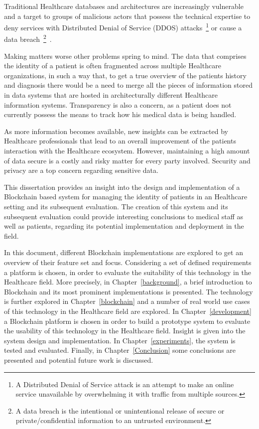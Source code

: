 Traditional Healthcare databases and architectures are increasingly vulnerable
and a target to groups of malicious actors that possess the technical expertise
to deny services with Distributed Denial of Service (DDOS) attacks~\footnote{A
Distributed Denial of Service attack is an attempt to make an online service
unavailable by overwhelming it with traffic from multiple sources.} or cause a
data breach~\footnote{A data breach is the intentional or unintentional release
of secure or private/confidential information to an untrusted
environment.}~\cite{mcCoy2018}. 

Making matters worse other problems spring to mind. The data that comprises the
identity of a patient is often fragmented across multiple Healthcare
organizations, in such a way that, to get a true overview of the patients
history and diagnosis there would be a need to merge all the pieces of
information stored in data systems that are hosted in architecturally different
Healthcare information systems. Transparency is also a concern, as a patient
does not currently possess the means to track how his medical data is being
handled.

As more information becomes available, new insights can be extracted by
Healthcare professionals that lead to an overall improvement of the patients
interaction with the Healthcare ecosystem. However, maintaining a high amount
of data secure is a costly and risky matter for every party involved. Security
and privacy are a top concern regarding sensitive data. 

This dissertation provides an insight into the design and implementation of a
Blockchain based system for managing the identity of patients in an Healthcare
setting and its subsequent evaluation. The creation of this system and its
subsequent evaluation could provide interesting conclusions to medical staff as
well as patients, regarding its potential implementation and deployment in the
field.

In this document, different Blockchain implementations are explored to get an
overview of their feature set and focus. Considering a set of defined
requirements a platform is chosen, in order to evaluate the suitability of this
technology in the Healthcare field. More precisely, in
Chapter~\ref{background}, a brief introduction to Blockchain and its most
prominent implementations is presented. The technology is further explored in
Chapter~\ref{blockchain} and a number of real world use cases of this
technology in the Healthcare field are explored.  In Chapter~\ref{development}
a Blockchain platform is chosen in order to build a prototype system to
evaluate the usability of this technology in the Healthcare field. Insight is
given into the system design and implementation. In Chapter~\ref{experiments},
the system is tested and evaluated. Finally, in Chapter~\ref{Conclusion} some
conclusions are presented and potential future work is discussed.
